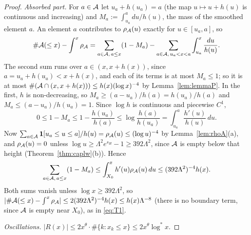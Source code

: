 \begin{proof}
\emph{Absorbed part.}
For $a\in\mathcal{A}$ let $u_a+h(u_a)=a$ (the map $u\mapsto u+h(u)$ is continuous and increasing) and $M_a:=\int_{u_a}^adu/h(u)$, the
mass of the smoothed element $a$.
An element $a$ contributes to $\rho_{\mathcal{A}}(u)$ exactly for $u\in[u_a,a]$, so
\[
  \#\mathcal{A}(\le x)-\int^x\rho_{\mathcal{A}}=\sum_{a\in\mathcal{A},\,a\le x}(1-M_a)-\sum_{a\in\mathcal{A},\,u_a<x<a}\int_{u_a}^x\frac{du}{h(u)} .
\]
The second sum runs over $a\in(x,x+h(x))$, since $a=u_a+h(u_a)<x+h(x)$, and each of its terms is at most $M_a\le1$; so
it is at most $\#(\mathcal{A}\cap(x,x+h(x)))\le h(x)(\log x)^{-4}$ by Lemma~\ref{lem:lemmaP}. In the first, $h$ is non-decreasing, so
$M_a\ge(a-u_a)/h(a)=h(u_a)/h(a)$ and $M_a\le(a-u_a)/h(u_a)=1$. Since $\log h$ is continuous and piecewise $C^1$,
\[
  0\le1-M_a\le1-\frac{h(u_a)}{h(a)}\le\log\frac{h(a)}{h(u_a)}=\int_{u_a}^a\frac{h'(u)}{h(u)}\,du .
\]
Now $\sum_{a\in\mathcal{A}}\mathbf 1[u_a\le u\le a]/h(u)=\rho_{\mathcal{A}}(u)\le(\log u)^{-4}$ by Lemma~\ref{lem:rhoA}(a), and $\rho_{\mathcal{A}}(u)=0$ unless
$\log u\ge\Lambda^2e^{s_H}-1\ge392\Lambda^2$, since $\mathcal{A}$ is empty below that height (Theorem~\ref{thm:caplw}(b)). Hence
\[
  \sum_{a\in\mathcal{A},\,a\le x}(1-M_a)\le\int_{X_0}^xh'(u)\rho_{\mathcal{A}}(u)\,du\le(392\Lambda^2)^{-4}h(x).
\]
Both sums vanish unless $\log x\ge392\Lambda^2$, so $|\#\mathcal{A}(\le x)-\int^x\rho_{\mathcal{A}}|\le2(392\Lambda^2)^{-4}h(x)\le h(x)\Lambda^{-8}$
(there is no boundary term, since $\mathcal{A}$ is empty near $X_0$), as in \eqref{eq:T1}.

\emph{Oscillations.} $|R(x)|\le2x^{\theta}\cdot\#\{k:x_k\le x\}\le2x^{\theta}\log^*x$.
\end{proof}

